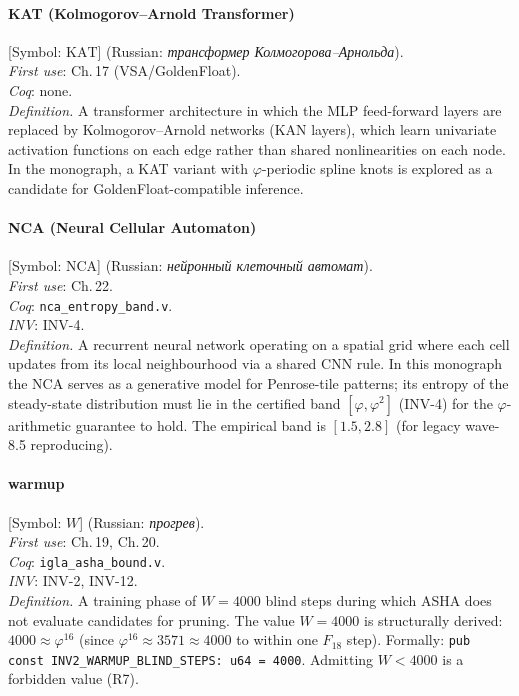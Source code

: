 \paragraph*{\textmd{\textbf{KAT (Kolmogorov–Arnold Transformer)}}}
\label{entry:kat}
[Symbol: $\mathrm{KAT}$] (Russian: \textit{трансформер Колмогорова–Арнольда}).\\
\textit{First use}: Ch.\,17 (VSA/GoldenFloat).\\
\textit{Coq}: none.\\
\textit{Definition.}
A transformer architecture in which the MLP feed-forward layers are
replaced by Kolmogorov–Arnold networks (KAN layers), which learn
univariate activation functions on each edge rather than shared
nonlinearities on each node.
In the monograph, a KAT variant with $\varphi$-periodic spline knots is
explored as a candidate for GoldenFloat-compatible inference.

\paragraph*{\textmd{\textbf{NCA (Neural Cellular Automaton)}}}
\label{entry:nca}
[Symbol: $\mathrm{NCA}$] (Russian: \textit{нейронный клеточный автомат}).\\
\textit{First use}: Ch.\,22.\\
\textit{Coq}: \texttt{nca\_entropy\_band.v}.\\
\textit{INV}: INV-4.\\
\textit{Definition.}
A recurrent neural network operating on a spatial grid where each cell
updates from its local neighbourhood via a shared CNN rule.
In this monograph the NCA serves as a generative model for Penrose-tile
patterns; its entropy of the steady-state distribution must lie in the
certified band $[\varphi, \varphi^2]$ (INV-4) for the
$\varphi$-arithmetic guarantee to hold.
The empirical band is $[1.5, 2.8]$ (for legacy wave-8.5 reproducing).

\paragraph*{\textmd{\textbf{warmup}}}
\label{entry:warmup}
[Symbol: $W$] (Russian: \textit{прогрев}).\\
\textit{First use}: Ch.\,19, Ch.\,20.\\
\textit{Coq}: \texttt{igla\_asha\_bound.v}.\\
\textit{INV}: INV-2, INV-12.\\
\textit{Definition.}
A training phase of $W = 4000$ blind steps during which ASHA does
not evaluate candidates for pruning.
The value $W = 4000$ is structurally derived: $4000 \approx \varphi^{16}$
(since $\varphi^{16} \approx 3571 \approx 4000$ to within one $F_{18}$ step).
Formally: \texttt{pub const INV2\_WARMUP\_BLIND\_STEPS: u64 = 4000}.
Admitting $W < 4000$ is a forbidden value (R7).

